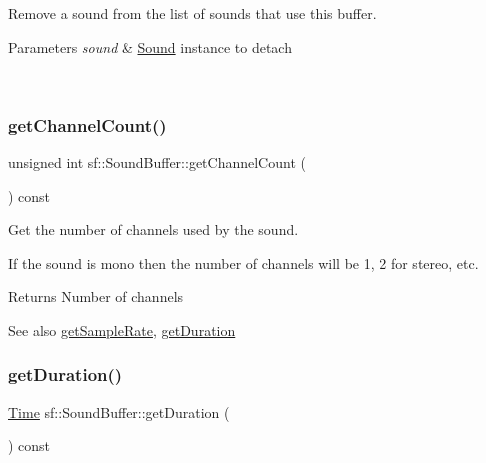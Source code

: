 Remove a sound from the list of sounds that use this buffer. 


\begin{DoxyParams}{Parameters}
{\em sound} & \mbox{\hyperlink{classsf_1_1_sound}{Sound}} instance to detach \begin{DoxyVerb}\end{DoxyVerb}
 \\
\hline
\end{DoxyParams}
\mbox{\label{classsf_1_1_sound_buffer_a127707b831d875ed790eef1aa2b9fcc3}} 
\subsubsection{\texorpdfstring{getChannelCount()}{getChannelCount()}}
{\footnotesize\ttfamily unsigned int sf\+::\+Sound\+Buffer\+::get\+Channel\+Count (\begin{DoxyParamCaption}{ }\end{DoxyParamCaption}) const}



Get the number of channels used by the sound. 

If the sound is mono then the number of channels will be 1, 2 for stereo, etc.

\begin{DoxyReturn}{Returns}
Number of channels
\end{DoxyReturn}
\begin{DoxySeeAlso}{See also}
\mbox{\hyperlink{classsf_1_1_sound_buffer_a2c2cf0078ce0549246ecc4a1646212b4}{get\+Sample\+Rate}}, \mbox{\hyperlink{classsf_1_1_sound_buffer_a280a581d9b360fd16121714c51fc8261}{get\+Duration}} \begin{DoxyVerb}\end{DoxyVerb}
 
\end{DoxySeeAlso}
\mbox{\label{classsf_1_1_sound_buffer_a280a581d9b360fd16121714c51fc8261}} 
\subsubsection{\texorpdfstring{getDuration()}{getDuration()}}
{\footnotesize\ttfamily \mbox{\hyperlink{classsf_1_1_time}{Time}} sf\+::\+Sound\+Buffer\+::get\+Duration (\begin{DoxyParamCaption}{ }\end{DoxyParamCaption}) const}



